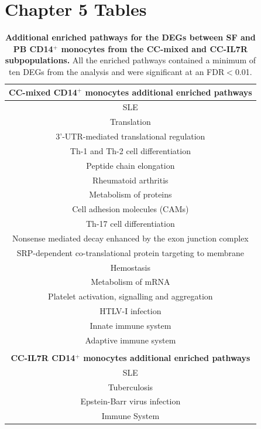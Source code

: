 \section{Chapter 5 Tables}

\begin{table}[htbp]
\centering
\begin{tabular}{@{} c }
\toprule
\textbf{CC-mixed CD14$^+$ monocytes additional enriched pathways} \\
\midrule
\midrule
SLE \\
Translation \\
3'-UTR-mediated translational regulation \\
Th-1 and Th-2 cell differentiation \\
Peptide chain elongation \\
Rheumatoid arthritis \\
Metabolism of proteins \\
Cell adhesion molecules (CAMs) \\
Th-17 cell differentiation \\
Nonsense mediated decay enhanced by the exon junction complex \\
SRP-dependent co-translational protein targeting to membrane \\
Hemostasis \\
Metabolism of mRNA \\
Platelet activation, signalling and aggregation \\
HTLV-I infection \\
Innate immune system \\
Adaptive immune system \\
                        \\
\textbf{CC-IL7R CD14$^+$ monocytes additional enriched pathways} \\
\midrule
\midrule
SLE \\
Tuberculosis \\
Epstein-Barr virus infection \\
Immune System \\
\bottomrule
\end{tabular}
\medskip %
\caption[Additional enriched pathways for the DEGs between SF and PB CD14$^+$ monocytes from the CC-mixed and CC-IL7R subpopulations.]{\textbf{Additional enriched pathways for the DEGs between SF and PB CD14$^+$ monocytes from the CC-mixed and CC-IL7R subpopulations.} All the enriched pathways contained a minimum of ten DEGs from the analysis and were significant at an FDR$<$0.01.}
\label{tab:PSA_scRNAseq_CC_mixed_and_IL7R_additional_pathways}
\end{table}


